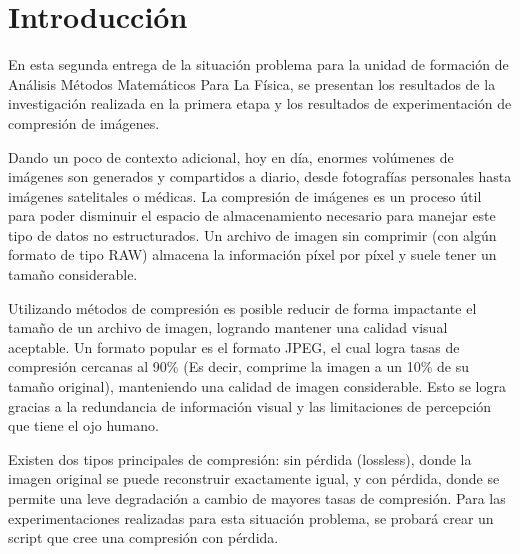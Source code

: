 \section{Introducción}

En esta segunda entrega de la situación problema para la unidad de formación de Análisis Métodos Matemáticos Para La Física,
se presentan los resultados de la investigación realizada en la primera etapa y los resultados de experimentación de compresión de imágenes.

Dando un poco de contexto adicional, hoy en día, enormes volúmenes de imágenes son generados y compartidos a diario, desde fotografías personales hasta imágenes satelitales o médicas.
La compresión de imágenes es un proceso útil para poder disminuir el espacio de almacenamiento necesario para manejar este tipo de datos no estructurados. 
Un archivo de imagen sin comprimir (con algún formato de tipo RAW) almacena la información píxel por píxel y suele tener un tamaño considerable. 

Utilizando métodos de compresión es posible reducir de forma impactante el tamaño de un archivo de imagen, logrando mantener una calidad visual aceptable. Un formato popular es el formato JPEG, el cual logra tasas de compresión cercanas al 90\% (Es decir, comprime la imagen a un 10\% de su tamaño original), manteniendo una calidad de imagen considerable.
Esto se logra gracias a la redundancia de información visual y las limitaciones de percepción que tiene el ojo humano.

Existen dos tipos principales de compresión: sin pérdida (lossless), donde la imagen original se puede reconstruir exactamente igual, y con pérdida, donde se permite una leve degradación a cambio de mayores tasas de compresión.
Para las experimentaciones realizadas para esta situación problema, se probará crear un script que cree una compresión con pérdida.